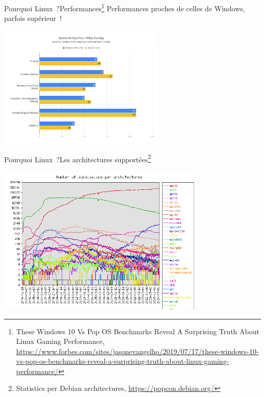 \documentclass{beamer}
\begin{document}
    \begin{frame}{Pourquoi Linux~?}{Performances\footnote{These Windows 10 Vs Pop OS Benchmarks Reveal A Surprising Truth About Linux Gaming Performance, \url{https://www.forbes.com/sites/jasonevangelho/2019/07/17/these-windows-10-vs-pop-os-benchmarks-reveal-a-surprising-truth-about-linux-gaming-performance/}}}
        Performances proches de celles de Windows, parfois supérieur~!
        \begin{center}
            \includegraphics[width=8cm]{image/linux-vs-windows}
        \end{center}
    \end{frame}

    \begin{frame}{Pourquoi Linux~?}{Les architectures supportées\footnote{Statistics per Debian architectures, \url{https://popcon.debian.org/}}}
        \begin{center}
            \includegraphics[width=10cm]{image/submission-by-architecture}
        \end{center}
    \end{frame}
\end{document}
